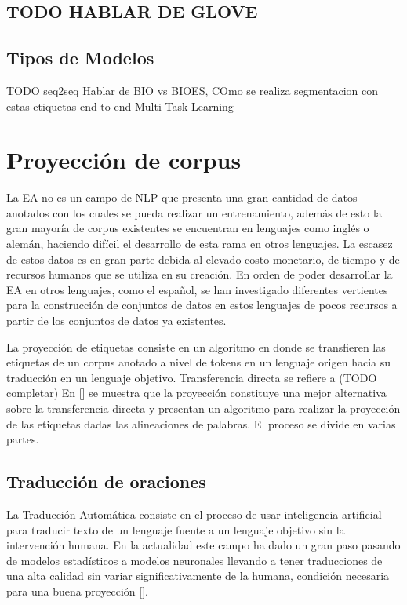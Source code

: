 \subsection{TODO HABLAR DE GLOVE}

\subsection{Tipos de Modelos}
TODO
	seq2seq
	Hablar de BIO vs BIOES, COmo se realiza segmentacion con estas etiquetas
	end-to-end 
	Multi-Task-Learning

\section{Proyección de corpus}

La EA no es un campo de NLP que presenta una gran cantidad de datos anotados con los cuales se pueda realizar 
un entrenamiento, además de esto la gran mayoría de corpus existentes se encuentran en lenguajes como inglés o alemán,
haciendo difícil el desarrollo de esta rama en otros lenguajes.
La escasez de estos datos es en gran parte debida al elevado costo monetario, de tiempo y de recursos humanos que se utiliza
en su creación. En orden de poder desarrollar la EA en otros lenguajes, como el español, se han investigado diferentes vertientes
para la construcción de conjuntos de datos en estos lenguajes de pocos recursos a partir de los conjuntos de datos ya 
existentes.

La proyección de etiquetas consiste en un algoritmo en donde se 
transfieren las etiquetas de un corpus anotado a nivel de tokens en un lenguaje origen hacia su traducción en un 
lenguaje objetivo. Transferencia directa se refiere a (TODO completar)
En [\cite{eger2018cross}] se muestra que la proyección constituye una mejor alternativa sobre la transferencia
directa y presentan un algoritmo para realizar la proyección de las etiquetas dadas las alineaciones de palabras.
El proceso se divide en varias partes.

\subsection{Traducción de oraciones}

La Traducción Automática consiste en el proceso de usar inteligencia artificial para
traducir texto de un lenguaje fuente a un lenguaje objetivo sin la intervención humana.
En la actualidad este campo ha dado un gran paso pasando de modelos estadísticos a modelos
neuronales llevando a tener traducciones de una alta calidad sin variar significativamente de la humana, 
condición necesaria para una buena proyección [\cite{eger2018cross}].

